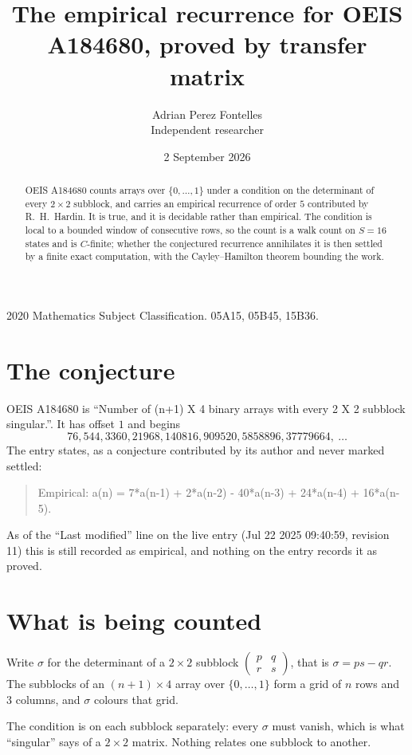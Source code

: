 \documentclass[11pt,a4paper]{article}
\title{The empirical recurrence for OEIS A184680, proved by transfer matrix}
\author{Adrian Perez Fontelles\\ \small Independent researcher}
\date{2 September 2026}
\theoremstyle{plain}
\theoremstyle{definition}
\begin{document}
\maketitle

\begin{abstract}
OEIS A184680 counts arrays over $\{0,\dots,1\}$ under a condition on the determinant of every
$2\times2$ subblock, and carries an empirical recurrence of order $5$ contributed by
R.~H.~Hardin. It is true, and it is decidable rather than empirical. The condition is local to
a bounded window of consecutive rows, so the count is a walk count on $S=16$ states and is
$C$-finite; whether the conjectured recurrence annihilates it is then settled by a finite exact
computation, with the Cayley--Hamilton theorem bounding the work.
\end{abstract}

\noindent\small 2020 Mathematics Subject Classification. 05A15, 05B45, 15B36.\normalsize

\section{The conjecture}

OEIS A184680 is ``Number of (n+1) X 4 binary arrays with every 2 X 2 subblock singular.''. It has offset $1$ and begins
\[
76, 544, 3360, 21968, 140816, 909520, 5858896, 37779664,\ \dots
\]
The entry states, as a conjecture contributed by its author and never marked settled:
\begin{quote}
Empirical: a(n) = 7*a(n-1) + 2*a(n-2) - 40*a(n-3) + 24*a(n-4) + 16*a(n-5).
\end{quote}
As of the ``Last modified'' line on the live entry (Jul 22 2025 09:40:59, revision 11) this is still
recorded as empirical, and nothing on the entry records it as proved.

\section{What is being counted}

Write $\sigma$ for the determinant of a $2\times2$ subblock
$\begin{pmatrix}p&q\\r&s\end{pmatrix}$, that is $\sigma=ps-qr$. The subblocks of an
$(n+1)\times4$ array over $\{0,\dots,1\}$ form a grid of $n$ rows and $3$
columns, and $\sigma$ colours that grid.

The condition is on each subblock separately: every $\sigma$ must vanish, which is what
``singular'' says of a $2\times2$ matrix. Nothing
relates one subblock to another.
\end{document}
